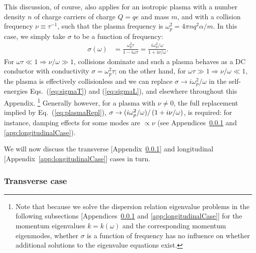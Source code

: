 \documentclass[amsmath,amssymb,aps,10pt,prd,letterpaper,nofootinbib,balancelastpage,notitlepage,superscriptaddress,twocolumn,floatfix]{revtex4-2}
\newcommand{\appref}[2][x]{Appendi{#1}~\ref{#2}}	%
\renewcommand{\eqref}[2][]{Eq{#1}.~(\ref{eq:#2})}	%
\newcommand{\lb}{\ensuremath{\left}}					%
\newcommand{\rb}{\ensuremath{\right}}					%
\begin{document}
This discussion, of course, also applies for an isotropic plasma with a number density $n$ of charge carriers of charge $Q=qe$ and mass $m$, and with a collision frequency $\nu \equiv \tau^{-1}$, such that the plasma frequency is $\omega_p^2 = 4\pi n q^2 \alpha / m$.
In this case, we simply take $\sigma$ to be a function of frequency: 
\begin{align}
   \sigma(\omega) &= \frac{\omega_p^2 \tau}{1-i\omega \tau} 
   = \frac{i\omega_p^2/\omega}{1+i\nu / \omega }.\label{eq:plasmaRepl}
\end{align}
For $\omega \tau \ll 1 \Rightarrow \nu/\omega \gg 1$, collisions dominate and such a plasma behaves as a DC conductor with conductivity $\sigma = \omega_p^2\tau$; on the other hand, for $\omega \tau \gg 1 \Rightarrow \nu/\omega \ll 1$, the plasma is effectively collisionless and we can replace $\sigma \rightarrow i\omega_p^2/\omega$ in the self-energies \eqref[s]{sigmaT} and (\ref{eq:sigmaL}), and elsewhere throughout this Appendix.%
\footnote{\label{ftnt:noExtraSolutions}%
    Note that because we solve the dispersion relation eigenvalue problems in the following subsections [\appref[ces]{app:transverseCase} and \ref{app:longitudinalCase}] for the momentum eigenvalues $k=k(\omega)$ and the corresponding momentum eigenmodes, whether $\sigma$ is a function of frequency has no influence on whether additional solutions to the eigenvalue equations exist.
} %
Generally however, for a plasma with $\nu \neq0$, the full replacement implied by \eqref{plasmaRepl}, $\sigma \rightarrow (i\omega_p^2/\omega) / \lb( 1+i\nu / \omega \rb)$, is required: for instance, damping effects for some modes are $\propto \nu$ (see \appref[ces]{app:transverseCase} and \ref{app:longitudinalCase}).

We will now discuss the transverse [\appref{app:transverseCase}] and longitudinal [\appref{app:longitudinalCase}] cases in turn.


\subsubsection{Transverse case}
\label{app:transverseCase}
\end{document}
